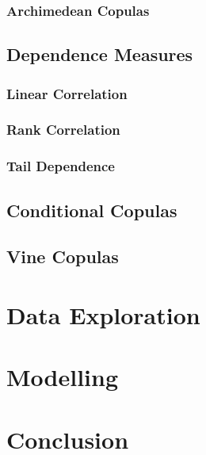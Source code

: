 \documentclass[12pt, twoside]{article}
\numberwithin{equation}{section}
\numberwithin{table}{section}
\numberwithin{figure}{section}
\begin{document}
\subsubsection{Archimedean Copulas} \label{sssec:archimedean_copulas}

\subsection{Dependence Measures} \label{ssec:dependence_measures}

\subsubsection{Linear Correlation} \label{sssec:linear_correlation}

\subsubsection{Rank Correlation} \label{sssec:rank_correlation}

\subsubsection{Tail Dependence} \label{sssec:tail_dependence}

\subsection{Conditional Copulas} \label{ssec:conditional_copulas}
%
\subsection{Vine Copulas} \label{ssec:vine_copulas}
%
\newpage
\thispagestyle{empty}
\cleardoublepage


\thispagestyle{plain}
\section{Data Exploration} \label{sec:data_exploration}
\newpage
\thispagestyle{empty}
\cleardoublepage


\thispagestyle{plain}
\section{Modelling} \label{sec:modelling}
\newpage
\thispagestyle{empty}
\cleardoublepage


\thispagestyle{plain}
\section{Conclusion} \label{sec:conclusion}
%
\newpage
\thispagestyle{empty}
\cleardoublepage
\end{document}
